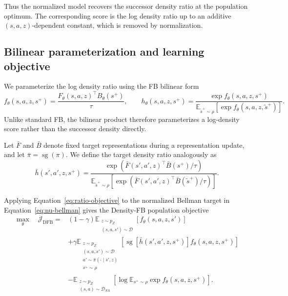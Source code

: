 \documentclass[11pt]{article}
\newcommand{\sg}{\operatorname{sg}}
\begin{document}
Thus the normalized model recovers the successor density ratio at the population optimum. The corresponding score is the log density ratio up to an additive $(s,a,z)$-dependent constant, which is removed by normalization.


\subsection{Bilinear parameterization and learning objective}

We parameterize the log density ratio using the FB bilinear form
\begin{equation}
    f_\theta(s,a,z,s^+) =
    \frac{F_\theta(s,a,z)^\top B_\theta(s^+)}{\tau},
    \qquad
    h_\theta(s,a,z,s^+) =
    \frac{\exp f_\theta(s,a,z,s^+)}
    {\mathbb E_{\tilde s^+\sim\rho}
    \left[\exp f_\theta(s,a,z,\tilde s^+)\right]}.
    \label{eq:dfb-density}
\end{equation}
Unlike standard FB, the bilinear product therefore parameterizes a log-density score rather than the successor density directly.

Let $\bar F$ and $\bar B$ denote fixed target representations during a representation update, and let $\bar\pi=\sg(\pi)$. We define the target density ratio analogously as
\[
    \bar h(s',a',z,s^+)
    =
    \frac{
        \exp\left(\bar F(s',a',z)^\top\bar B(s^+)/\tau\right)
    }{
        \mathbb E_{\tilde s^+\sim\rho}
        \left[
            \exp\left(\bar F(s',a',z)^\top\bar B(\tilde s^+)/\tau\right)
        \right]
    }.
\]

Applying Equation~\eqref{eq:ratio-objective} to the normalized Bellman target in Equation~\eqref{eq:nu-bellman} gives the Density-FB population objective
\begin{equation}
\begin{aligned}
    \max_\theta\quad
    \mathcal J_{\mathrm{DFB}}
    ={}&
    (1-\gamma)
    \mathbb E_{\substack{
        z\sim p_Z\\
        (s,a,s')\sim\mathcal D
    }}
    \left[
        f_\theta(s,a,z,s')
    \right]
    \\
    &+
    \gamma
    \mathbb E_{\substack{
        z\sim p_Z\\
        (s,a,s')\sim\mathcal D\\
        a'\sim\bar\pi(\cdot\mid s',z)\\
        s^+\sim\rho
    }}
    \left[
        \sg\left[\bar h(s',a',z,s^+)\right]
        f_\theta(s,a,z,s^+)
    \right]
    \\
    &-
    \mathbb E_{\substack{
        z\sim p_Z\\
        (s,a)\sim\mathcal D_{SA}
    }}
    \left[
        \log
        \mathbb E_{s^+\sim\rho}
        \exp f_\theta(s,a,z,s^+)
    \right].
\end{aligned}
\label{eq:dfb-final}
\end{equation}
\end{document}
